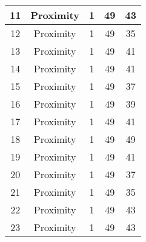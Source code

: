 \documentclass[results.tex]{subfiles}
\begin{document}
\begin{center}
\begin{tabular}{| c || c | c | c | c |}
            \hline
            11                      & Proximity                    & 1                      & 49                      & 43                   \\
            \hline
            12                      & Proximity                    & 1                      & 49                      & 35                   \\
            \hline
            13                      & Proximity                    & 1                      & 49                      & 41                   \\
            \hline
            14                      & Proximity                    & 1                      & 49                      & 41                   \\
            \hline
            15                      & Proximity                    & 1                      & 49                      & 37                   \\
            \hline
            16                      & Proximity                    & 1                      & 49                      & 39                   \\
            \hline
            17                      & Proximity                    & 1                      & 49                      & 41                   \\
            \hline
            18                      & Proximity                    & 1                      & 49                      & 49                   \\
            \hline
            19                      & Proximity                    & 1                      & 49                      & 41                   \\
            \hline
            20                      & Proximity                    & 1                      & 49                      & 37                   \\
            \hline
            21                      & Proximity                    & 1                      & 49                      & 35                   \\
            \hline
            22                      & Proximity                    & 1                      & 49                      & 43                   \\
            \hline
            23                      & Proximity                    & 1                      & 49                      & 43                   \\

\end{tabular}
\end{center}
\end{document}
